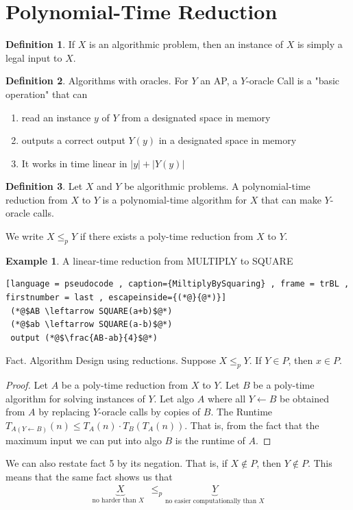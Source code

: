 \documentclass[a4paper]{article}
\theoremstyle{plain}
\theoremstyle{definition}
\newtheorem{defn}{Definition}[section]
\newtheorem{exmp}{Example}[section]
\theoremstyle{remark}
\begin{document}
\section{Polynomial-Time Reduction}
\begin{defn}
	If $X$ is an algorithmic problem, then an instance of $X$ is simply a legal input to $X$.
\end{defn}
\begin{defn}
	Algorithms with oracles. For $Y$ an AP, a $Y$-oracle Call is a "basic operation" that can
	\begin{enumerate}
		\item read an instance $y$ of $Y$ from a designated space in memory
		\item outputs a correct output $Y(y)$ in a designated space in memory
		\item It works in time linear in $|y| + |Y(y)|$
	\end{enumerate}
\end{defn}
\begin{defn}
	Let $X$ and $Y$ be algorithmic problems. A polynomial-time reduction from $X$ to $Y$ is a polynomial-time algorithm for $X$ that can make $Y$-oracle calls.
\end{defn}
We write $X \le_p Y$ if there exists a poly-time reduction from $X$ to $Y$.
\begin{exmp}
	A linear-time reduction from MULTIPLY to SQUARE
	\begin{lstlisting}[language = pseudocode , caption={MiltiplyBySquaring} , frame = trBL , firstnumber = last , escapeinside={(*@}{@*)}]
 (*@$AB \leftarrow SQUARE(a+b)$@*) 
 (*@$ab \leftarrow SQUARE(a-b)$@*)
 output (*@$\frac{AB-ab}{4}$@*)
	\end{lstlisting}
\end{exmp}
	Fact. Algorithm Design using reductions. Suppose $X \le_p Y$. If $Y \in P$, then $x \in P$.
	\begin{proof}
		Let $A$ be a poly-time reduction from $X$ to $Y$. Let $B$ be a poly-time algorithm for solving instances of $Y$. Let algo $A$ where all $Y \leftarrow B$ be obtained from $A$ by replacing $Y$-oracle calls by copies of $B$. The Runtime $T_{A(Y \leftarrow B)}(n) \le T_A(n) \cdot T_B(T_A(n))$. That is, from the fact that the maximum input we can put into algo $B$ is the runtime of $A$.
	\end{proof}
	We can also restate fact 5 by its negation. That is, if $X \not\in P$, then $Y \not\in P$. This means that the same fact shows us that 
	\begin{align*}
		\underbrace{X}_{\text{no harder than $X$ }} \le_p \underbrace{Y}_{\text{no easier computationally than $X$}}
	\end{align*}
\end{document}
